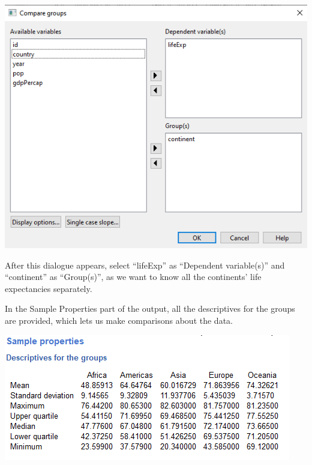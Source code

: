 \documentclass[
]{book}
\begin{document}
\includegraphics{img/ch2/comparewindow.png}

After this dialogue appears, select ``lifeExp'' as ``Dependent variable(s)'' and ``continent'' as ``Group(s)'', as we want to know all the continents' life expectancies separately.

In the Sample Properties part of the output, all the descriptives for the groups are provided, which lets us make comparisons about the data.

\includegraphics{img/ch2/comparegresults.png}
\end{document}
